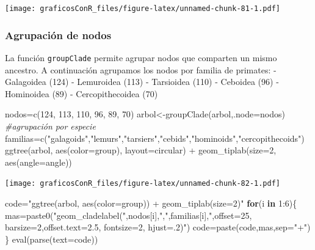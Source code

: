 \documentclass[
]{article}
\newenvironment{Shaded}{\begin{snugshade}}{\end{snugshade}}
\newcommand{\AttributeTok}[1]{\textcolor[rgb]{0.77,0.63,0.00}{#1}}
\newcommand{\CommentTok}[1]{\textcolor[rgb]{0.56,0.35,0.01}{\textit{#1}}}
\newcommand{\ControlFlowTok}[1]{\textcolor[rgb]{0.13,0.29,0.53}{\textbf{#1}}}
\newcommand{\DecValTok}[1]{\textcolor[rgb]{0.00,0.00,0.81}{#1}}
\newcommand{\FunctionTok}[1]{\textcolor[rgb]{0.00,0.00,0.00}{#1}}
\newcommand{\NormalTok}[1]{#1}
\newcommand{\OtherTok}[1]{\textcolor[rgb]{0.56,0.35,0.01}{#1}}
\newcommand{\SpecialCharTok}[1]{\textcolor[rgb]{0.00,0.00,0.00}{#1}}
\newcommand{\StringTok}[1]{\textcolor[rgb]{0.31,0.60,0.02}{#1}}
\numberwithin{ejcnt}{section}
\begin{document}
\texttt{[image: graficosConR\_files/figure-latex/unnamed-chunk-81-1.pdf]}

\hypertarget{agrupaciuxf3n-de-nodos}{%
\subsubsection{Agrupación de nodos}\label{agrupaciuxf3n-de-nodos}}

La función \texttt{groupClade} permite agrupar nodos que comparten un mismo ancestro. A continuación agrupamos los nodos por familia de primates:
- Galagoidea (124)
- Lemuroidea (113)
- Tarsioidea (110)
- Ceboidea (96)
- Hominoidea (89)
- Cercopithecoidea (70)

\begin{Shaded}
\begin{Highlighting}[]
\NormalTok{nodos}\OtherTok{=}\FunctionTok{c}\NormalTok{(}\DecValTok{124}\NormalTok{, }\DecValTok{113}\NormalTok{, }\DecValTok{110}\NormalTok{, }\DecValTok{96}\NormalTok{, }\DecValTok{89}\NormalTok{, }\DecValTok{70}\NormalTok{)}
\NormalTok{arbol}\OtherTok{\textless{}{-}}\FunctionTok{groupClade}\NormalTok{(arbol,}\AttributeTok{.node=}\NormalTok{nodos) }\CommentTok{\#agrupación por especie}
\NormalTok{familias}\OtherTok{=}\FunctionTok{c}\NormalTok{(}\StringTok{"galagoids"}\NormalTok{,}\StringTok{"lemurs"}\NormalTok{,}\StringTok{"tarsiers"}\NormalTok{,}\StringTok{"cebids"}\NormalTok{,}\StringTok{"hominoids"}\NormalTok{,}\StringTok{"cercopithecoids"}\NormalTok{)}
\FunctionTok{ggtree}\NormalTok{(arbol, }\FunctionTok{aes}\NormalTok{(}\AttributeTok{color=}\NormalTok{group), }\AttributeTok{layout=}\StringTok{\textquotesingle{}circular\textquotesingle{}}\NormalTok{) }\SpecialCharTok{+} 
  \FunctionTok{geom\_tiplab}\NormalTok{(}\AttributeTok{size=}\DecValTok{2}\NormalTok{, }\FunctionTok{aes}\NormalTok{(}\AttributeTok{angle=}\NormalTok{angle))}
\end{Highlighting}
\end{Shaded}

\texttt{[image: graficosConR\_files/figure-latex/unnamed-chunk-82-1.pdf]}

\begin{Shaded}
\begin{Highlighting}[]
\NormalTok{code}\OtherTok{=}\StringTok{"ggtree(arbol, aes(color=group)) + geom\_tiplab(size=2)"}
\ControlFlowTok{for}\NormalTok{(i }\ControlFlowTok{in} \DecValTok{1}\SpecialCharTok{:}\DecValTok{6}\NormalTok{)\{}
\NormalTok{  mas}\OtherTok{=}\FunctionTok{paste0}\NormalTok{(}\StringTok{"geom\_cladelabel("}\NormalTok{,nodos[i],}\StringTok{",\textquotesingle{}"}\NormalTok{,familias[i],}\StringTok{"\textquotesingle{},offset=25, barsize=2,offset.text=2.5, fontsize=2, hjust=.2)"}\NormalTok{)}
\NormalTok{  code}\OtherTok{=}\FunctionTok{paste}\NormalTok{(code,mas,}\AttributeTok{sep=}\StringTok{"+"}\NormalTok{)}
\NormalTok{  \}}
\FunctionTok{eval}\NormalTok{(}\FunctionTok{parse}\NormalTok{(}\AttributeTok{text=}\NormalTok{code))}
\end{Highlighting}
\end{Shaded}
\end{document}
